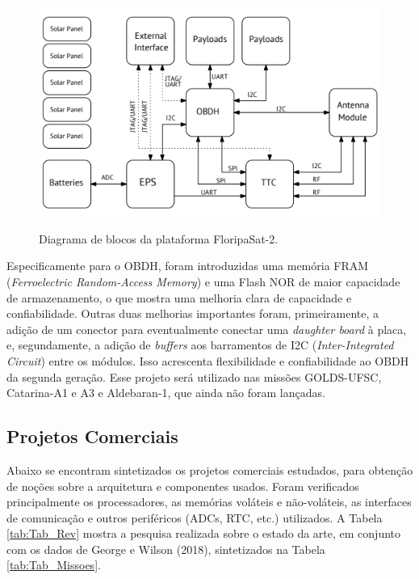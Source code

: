 \begin{figure}[H]
    \centering
    \caption{Diagrama de blocos da plataforma FloripaSat-2.}
    \includegraphics[scale=0.8]{images/floripasat2.png}
    \label{fig:floripasat2}
\end{figure}

Especificamente para o OBDH, foram introduzidas uma memória FRAM (\textit{Ferroelectric Random-Access Memory}) e uma Flash NOR de maior capacidade de armazenamento, o que mostra uma melhoria clara de capacidade e confiabilidade. Outras duas melhorias importantes foram, primeiramente, a adição de um conector para eventualmente conectar uma \textit{daughter board} à placa, e, segundamente, a adição de \textit{buffers} aos barramentos de I2C (\textit{Inter-Integrated Circuit}) entre os módulos. Isso acrescenta flexibilidade e confiabilidade ao OBDH da segunda geração. Esse projeto será utilizado nas missões GOLDS-UFSC, Catarina-A1 e A3 e Aldebaran-1, que ainda não foram lançadas.

\subsection{Projetos Comerciais}

Abaixo se encontram sintetizados os projetos comerciais estudados, para obtenção de noções sobre a arquitetura e componentes usados. Foram verificados principalmente os processadores, as memórias voláteis e não-voláteis, as interfaces de comunicação e outros periféricos (ADCs, RTC, etc.) utilizados. A Tabela \ref{tab:Tab_Rev} mostra a pesquisa realizada sobre o estado da arte, em conjunto com os dados de George e Wilson (2018), sintetizados na Tabela \ref{tab:Tab_Missoes}.

